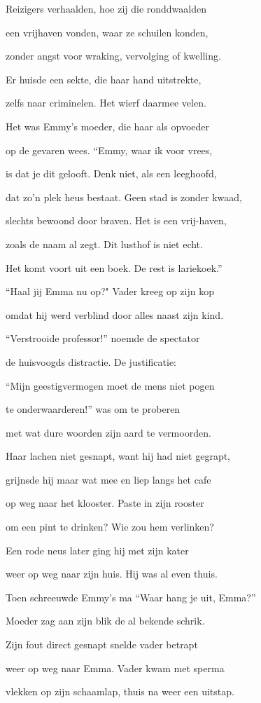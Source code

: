 Reizigers verhaalden,
hoe zij die ronddwaalden

een vrijhaven vonden,
waar ze schuilen konden,

zonder angst voor wraking,
vervolging of kwelling.

Er huisde een sekte,
die haar hand uitstrekte,

zelfs naar criminelen.
Het wierf daarmee velen.

Het was Emmy’s moeder,
die haar als opvoeder

op de gevaren wees.
“Emmy, waar ik voor vrees,

is dat je dit gelooft.
Denk niet, als een leeghoofd,

dat zo’n plek heus bestaat.
Geen stad is zonder kwaad,

slechts bewoond door braven.
Het is een vrij-haven,

zoals de naam al zegt.
Dit lusthof is niet echt.

Het komt voort uit een boek.
De rest is lariekoek.”

“Haal jij Emma nu op?"
Vader kreeg op zijn kop

omdat hij werd verblind
door alles naast zijn kind.

“Verstrooide professor!”
noemde de spectator

de huisvoogds distractie.
De justificatie:

“Mijn geestigvermogen
moet de mens niet pogen

te onderwaarderen!”
was om te proberen

met wat dure woorden
zijn aard te vermoorden.

Haar lachen niet gesnapt,
want hij had niet gegrapt,

grijnsde hij maar wat mee
en liep langs het cafe

op weg naar het klooster.
Paste in zijn rooster

om een pint te drinken?
Wie zou hem verlinken?

Een rode neus later
ging hij met zijn kater

weer op weg naar zijn huis.
Hij was al even thuis.

Toen schreeuwde Emmy’s ma
“Waar hang je uit, Emma?”

Moeder zag aan zijn blik
de al bekende schrik.

Zijn fout direct gesnapt
snelde vader betrapt

weer op weg naar Emma.
Vader kwam met sperma

vlekken op zijn schaamlap,
thuis na weer een uitstap.

